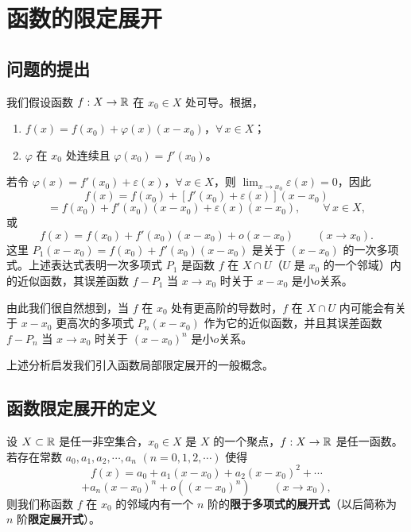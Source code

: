 \section{函数的限定展开}

\subsection{问题的提出}

我们假设函数 $f:X\to\mathbb{R}$ 在 $x_0\in X$ 处可导。根据，
\begin{enumerate}[label=\arabic{enumi})]
\item $f(x)=f(x_0)+\varphi(x)(x-x_0)$，$\forall\,x\in X$；
\item $\varphi$ 在 $x_0$ 处连续且 $\varphi(x_0)=f'(x_0)$。
\end{enumerate}

若令 $\varphi(x)=f'(x_0)+\varepsilon(x)$，$\forall\,x\in X$，则 $\displaystyle\lim_{x\to x_0}\varepsilon(x)=0$，因此
\[f(x)=f(x_0)+[f'(x_0)+\varepsilon(x)](x-x_0)\]
\[=f(x_0)+f'(x_0)(x-x_0)+\varepsilon(x)(x-x_0),\qquad\forall\,x\in X,\]
或
\[f(x)=f(x_0)+f'(x_0)(x-x_0)+o(x-x_0)\qquad(x\to x_0).\]
这里 $P_1(x-x_0)=f(x_0)+f'(x_0)(x-x_0)$ 是关于 $(x-x_0)$ 的一次多项式。上述表达式表明一次多项式 $P_1$ 是函数 $f$ 在 $X\cap U$（$U$ 是 $x_0$ 的一个邻域）内的近似函数，其误差函数 $f-P_1$ 当 $x\to x_0$ 时关于 $x-x_0$ 是小$o$关系。

由此我们很自然想到，当 $f$ 在 $x_0$ 处有更高阶的导数时，$f$ 在 $X\cap U$ 内可能会有关于 $x-x_0$ 更高次的多项式 $P_n(x-x_0)$ 作为它的近似函数，并且其误差函数 $f-P_n$ 当 $x\to x_0$ 时关于 $(x-x_0)^n$ 是小$o$关系。

上述分析启发我们引入函数局部限定展开的一般概念。

\subsection{函数限定展开的定义}

\begin{mydef*}{}

设 $X\subset\mathbb{R}$ 是任一非空集合，$x_0\in X$ 是 $X$ 的一个聚点，$f:X\to\mathbb{R}$ 是任一函数。若存在常数 $a_0,a_1,a_2,\cdots,a_n$ $(n=0,1,2,\cdots)$ 使得
\[f(x)=a_0+a_1(x-x_0)+a_2(x-x_0)^2+\cdots\]
\[+a_n(x-x_0)^n+o((x-x_0)^n)\qquad(x\to x_0),\]
则我们称函数 $f$ 在 $x_0$ 的邻域内有一个 $n$ 阶的\textbf{限于多项式的展开式}（以后简称为 $n$ 阶\textbf{限定展开式}）。

\end{mydef*}

